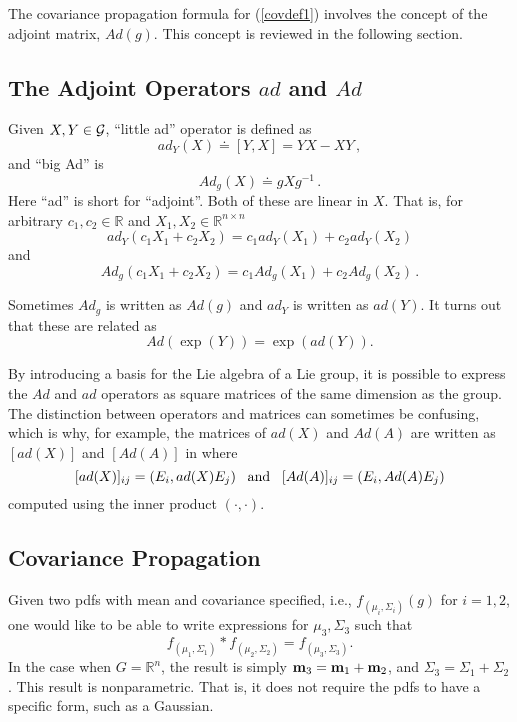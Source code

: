 \documentclass{svmult}
\newcommand{\IR}{\mathbb{R}}
\begin{document}
The covariance propagation formula for (\ref{covdef1}) involves the concept of the adjoint matrix, $Ad(g)$. This concept is reviewed in the following section.

\subsection{The Adjoint Operators $ad$ and $Ad$}

Given $X,Y \in {\cal G}$, ``little ad'' operator is defined as
$$ ad_Y(X) \doteq [Y,X] = YX - XY\,, $$
and ``big Ad'' is
$$ Ad_g(X) \doteq g X g^{-1} \,. $$
Here ``ad'' is short for ``adjoint''. Both of these are linear in $X$. That is, for arbitrary $c_1, c_2 \in \IR$ and $X_1, X_2 \in \IR^{n \times n}$
$$ ad_{Y}(c_1 X_1 + c_2 X_2) = c_1 ad_{Y}(X_1) + c_2 ad_{Y}(X_2) $$
and
$$ Ad_{g}(c_1 X_1 + c_2 X_2) = c_1 Ad_{g}(X_1) + c_2 Ad_{g}(X_2) \,. $$

Sometimes $Ad_g$ is written as $Ad(g)$ and $ad_Y$ is written as $ad(Y)$. It turns out that these are related as
$$ Ad(\exp(Y)) = \exp(ad(Y)). $$

By introducing a basis for the Lie algebra of a Lie group, it is possible to express the $Ad$ and $ad$ operators
as square matrices of the same dimension as the group.
The distinction between operators and matrices can sometimes be confusing, which is why, for example, the matrices of
$ad(X)$ and $Ad(A)$ are written as $[ad(X)]$ and $[Ad(A)]$ in \cite{dover,vol2} where
$$ [ad(X)]_{ij} = (E_i, ad(X) E_j) \,\,\,\,\,{\rm and}\,\,\,\,\, [Ad(A)]_{ij} = (E_i, Ad(A) E_j) $$
computed using the inner product $(\cdot,\cdot)$.

\subsection{Covariance Propagation}

Given two pdfs with mean and covariance specified, i.e.,  $f_{(\mu_i,\Sigma_i)}(g)$ for $i=1,2$, one would like to be able
to write expressions for $\mu_3,\Sigma_3$ such that
$$ f_{(\mu_1,\Sigma_1)} * f_{(\mu_2,\Sigma_2)} = f_{(\mu_3,\Sigma_3)}. $$
In the case when $G = \IR^n$, the result is simply
${\bf m}_3 = {\bf m}_1 + {\bf m}_2$, and $\Sigma_3 = \Sigma_1 + \Sigma_2$.
This result is nonparametric. That is, it does not require the pdfs to have
a specific form, such as a Gaussian.
\end{document}
